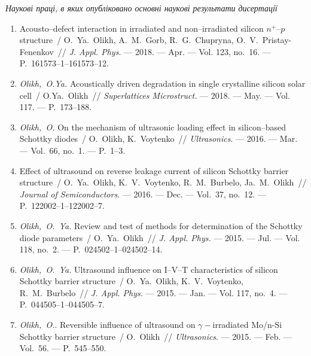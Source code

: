 \begin{center}%
{\textbf{\MakeUppercase{\authorbibtitle}} }
\end{center}%

\begin{center}%
\emph{Наукові праці, в яких опубліковано основні наукові результати дисертації}
\end{center}%
\begin{enumerate}[label=\arabic*.,leftmargin=1cm,itemindent=0cm]
\item
Acousto--defect interaction in irradiated and non--irradiated silicon
  $n^+$--$p$ structure~/ O.~Ya.~Olikh, A.~M.~Gorb, R.~G.~Chupryna,
  O.~V.~Pristay-Fenenkov~// \emph{J. Appl. Phys.} --- 2018. --- Apr. ---
 Vol. 123, no.~16. --- P.~161573--1--161573--12.

\item
\emph{Olikh,~O.Ya.} Acoustically driven degradation in single crystalline
  silicon solar cell~/ O.Ya.~Olikh~// \emph{Superlattices Microstruct.} ---
  2018. --- May. ---
  Vol. 117. ---
  P.~173--188.

\item
\emph{Olikh,~O.} On the mechanism of ultrasonic loading effect in
  silicon--based {S}chottky diodes~/ O.~Olikh, K.~Voytenko~//
  \emph{Ultrasonics}. ---
  2016. --- Mar. ---
  Vol.~66, no.~1. ---
  P.~1--3.

\item
Effect of ultrasound on reverse leakage current of silicon {S}chottky barrier
  structure~/ O.~Ya.~Olikh, K.~V.~Voytenko, R.~M.~Burbelo, Ja.~M.~Olikh~//
  \emph{Journal of Semiconductors}. ---
  2016. --- Dec. ---
  Vol.~37, no.~12. ---
  P.~122002--1--122002--7.

\item
\emph{Olikh,~O.~Ya.} Review and test of methods for determination of the
  {S}chottky diode parameters~/ O.~Ya.~Olikh~// \emph{J. Appl. Phys.} ---
  2015. --- Jul. ---
  Vol. 118, no.~2. ---
  P.~024502--1--024502--14.

\item
\emph{Olikh,~O.~Ya.} Ultrasound influence on {I}--{V}--{T} characteristics
  of silicon {S}chottky barrier structure~/ O.~Ya.~Olikh, K.~V.~Voytenko,
  R.~M.~Burbelo~// \emph{J. Appl. Phys.} ---
  2015. --- Jan. ---
  Vol. 117, no.~4. ---
  P.~044505--1--044505--7.

\item
\emph{Olikh,~O.}. Reversible influence of ultrasound on
  $\gamma-$irradiated {M}o/n-{S}i {S}chottky barrier structure~/ O.~Olikh~//
  \emph{Ultrasonics}. ---
  2015. --- Feb. ---
  Vol.~56. ---
  P.~545--550.


\end{enumerate}
